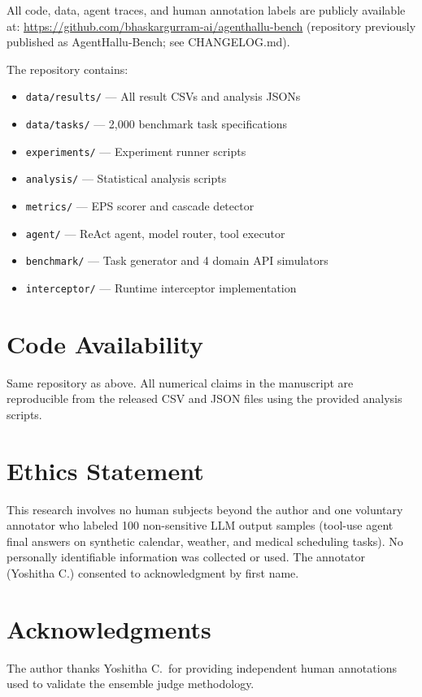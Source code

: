 \documentclass[preprint,review,12pt]{elsarticle}
\begin{document}
All code, data, agent traces, and human annotation labels are publicly
available at:
\url{https://github.com/bhaskargurram-ai/agenthallu-bench}
(repository previously published as AgentHallu-Bench; see CHANGELOG.md).

The repository contains:
\begin{itemize}
  \item \texttt{data/results/} --- All result CSVs and analysis JSONs
  \item \texttt{data/tasks/} --- 2,000 benchmark task specifications
  \item \texttt{experiments/} --- Experiment runner scripts
  \item \texttt{analysis/} --- Statistical analysis scripts
  \item \texttt{metrics/} --- EPS scorer and cascade detector
  \item \texttt{agent/} --- ReAct agent, model router, tool executor
  \item \texttt{benchmark/} --- Task generator and 4 domain API simulators
  \item \texttt{interceptor/} --- Runtime interceptor implementation
\end{itemize}

\section*{Code Availability}

Same repository as above.
All numerical claims in the manuscript are reproducible from the released
CSV and JSON files using the provided analysis scripts.

\section*{Ethics Statement}

This research involves no human subjects beyond the author and one
voluntary annotator who labeled 100 non-sensitive LLM output samples
(tool-use agent final answers on synthetic calendar, weather, and medical
scheduling tasks). No personally identifiable information was collected
or used. The annotator (Yoshitha C.) consented to acknowledgment by
first name.

\section*{Acknowledgments}

The author thanks Yoshitha C.\ for providing independent human
annotations used to validate the ensemble judge methodology.
\end{document}
